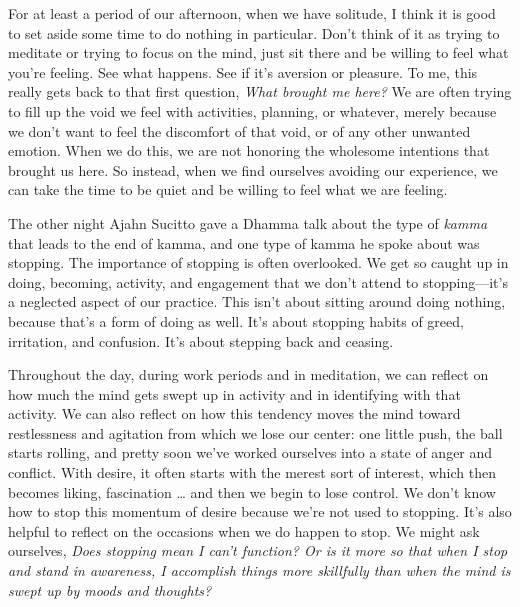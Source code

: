 For at least a period of our afternoon, when we have solitude, I think 
it is good to set aside some time to do nothing in particular. Don't 
think of it as trying to meditate or trying to focus on the mind, just 
sit there and be willing to feel what you're feeling. See what happens. 
See if it's aversion or pleasure. To me, this really gets back to that 
first question, \emph{What brought me here?} We are often trying to 
fill up the void we feel with activities, planning, or whatever, merely 
because we don't want to feel the discomfort of that void, or of any 
other unwanted emotion. When we do this, we are not honoring the 
wholesome intentions that brought us here. So instead, when we find 
ourselves avoiding our experience, we can take the time to be quiet and 
be willing to feel what we are feeling.


The other night Ajahn Sucitto gave a Dhamma talk about the type of 
\emph{kamma} that leads to the end of kamma, and one type of kamma he 
spoke about was stopping. The importance of stopping is often 
overlooked. We get so caught up in doing, becoming, activity, and 
engagement that we don't attend to stopping---it's a neglected aspect 
of our practice. This isn't about sitting around doing nothing, because 
that's a form of doing as well. It's about stopping habits of greed, 
irritation, and confusion. It's about stepping back and ceasing.

Throughout the day, during work periods and in meditation, we can 
reflect on how much the mind gets swept up in activity and in 
identifying with that activity. We can also reflect on how this 
tendency moves the mind toward restlessness and agitation from which we 
lose our center: one little push, the ball starts rolling, and pretty 
soon we've worked ourselves into a state of anger and conflict. With 
desire, it often starts with the merest sort of interest, which then 
becomes liking, fascination \ldots{} and then we begin to lose control. 
We don't know how to stop this momentum of desire because we're not 
used to stopping. It's also helpful to reflect on the occasions when we 
do happen to stop. We might ask ourselves, \emph{Does stopping mean I 
can't function? Or is it more so that when I stop and stand in 
awareness, I accomplish things more skillfully than when the mind is 
swept up by moods and thoughts?}

